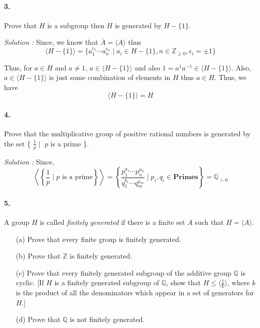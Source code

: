 \paragraph{3. } Prove that $H$ is a subgroup then $H$ is generated by $H-\{1\}$.

\vspace{4mm}
\textit{Solution :} Since, we know that $\bar{A}=\langle A \rangle$ thus
\[ \langle H-\{1\} \rangle = \{ a_1^{\epsilon_1} \cdots a_n^{\epsilon_n} \mid a_i \in H-\{1\}, n \in \mathbb{Z}_{\ge 0} ,
 \epsilon_i = \pm 1 \} \]

Thus, for $a \in H$ and $a \neq 1$, $a \in \langle H-\{1\} \rangle$ and also $1=a^{1}a^{-1} \in \langle H - \{1\} \rangle$.
Also, $a \in \langle H - \{1\} \rangle$ is just some combination of elements in $H$ thus $a \in H$. Thus, we have
\[ \langle H - \{1\} \rangle = H \]

\paragraph{4. } Prove that the multiplicative group of positive rational numbers is generated by the set 
\{ $\frac{1}{p} \mid$ $p$ is a prime \}.

\vspace{4mm}
\textit{Solution :} Since,
\[
\left \langle \left \{ \frac{1}{p} \mid p \text{ is a prime} \right \} \right \rangle =  
\left \{ \frac{p_1^{a_1} \cdots p_{n}^{a_n}}{q_1^{b_1} \cdots q_m^{a_m}} \mid p_i, q_i \in \mathbf{Primes} \right \} = \mathbb{Q}_{>0}
\]

\paragraph{5.} A group $H$ is called \textit{finitely generated} if there is a finite set $A$ such that $H = \langle A \rangle$.
\begin{enumerate}
    \item[(a)] Prove that every finite group is finitely generated.
    \item[(b)] Prove that $\mathbb{Z}$ is finitely generated.
    \item[(c)] Prove that every finitely generated subgroup of the additive group $\mathbb{Q}$ is cyclic. [If $H$ is a finitely generated subgroup of $\mathbb{Q}$, show that $H \le \langle \frac{1}{k} \rangle$, where $k$ is the product of all the denominators which appear in a set of generators for $H$.]
    \item[(d)] Prove that $\mathbb{Q}$ is not finitely generated.
\end{enumerate}

